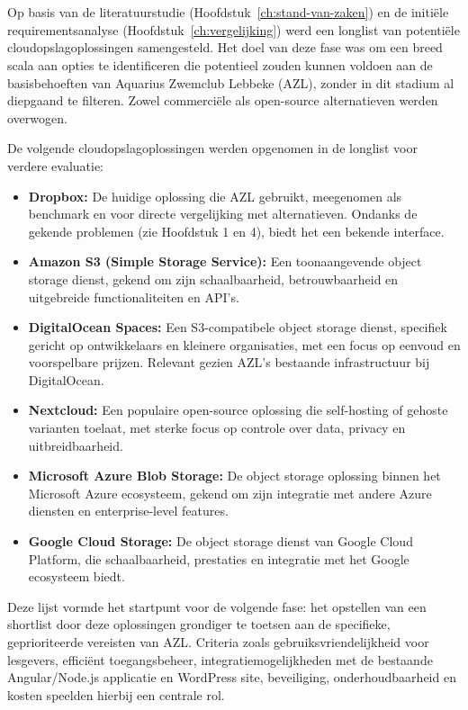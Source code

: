 \chapter{}
\label{ch:longlist}

Op basis van de literatuurstudie (Hoofdstuk~\ref{ch:stand-van-zaken}) en de initiële requirementsanalyse (Hoofdstuk~\ref{ch:vergelijking}) werd een longlist van potentiële cloudopslagoplossingen samengesteld. Het doel van deze fase was om een breed scala aan opties te identificeren die potentieel zouden kunnen voldoen aan de basisbehoeften van Aquarius Zwemclub Lebbeke (AZL), zonder in dit stadium al diepgaand te filteren. Zowel commerciële als open-source alternatieven werden overwogen.

De volgende cloudopslagoplossingen werden opgenomen in de longlist voor verdere evaluatie:

\begin{itemize}
    \item \textbf{Dropbox:} De huidige oplossing die AZL gebruikt, meegenomen als benchmark en voor directe vergelijking met alternatieven. Ondanks de gekende problemen (zie Hoofdstuk 1 en 4), biedt het een bekende interface.
    \item \textbf{Amazon S3 (Simple Storage Service):} Een toonaangevende object storage dienst, gekend om zijn schaalbaarheid, betrouwbaarheid en uitgebreide functionaliteiten en API's.
    \item \textbf{DigitalOcean Spaces:} Een S3-compatibele object storage dienst, specifiek gericht op ontwikkelaars en kleinere organisaties, met een focus op eenvoud en voorspelbare prijzen. Relevant gezien AZL's bestaande infrastructuur bij DigitalOcean.
    \item \textbf{Nextcloud:} Een populaire open-source oplossing die self-hosting of gehoste varianten toelaat, met sterke focus op controle over data, privacy en uitbreidbaarheid.
    \item \textbf{Microsoft Azure Blob Storage:} De object storage oplossing binnen het Microsoft Azure ecosysteem, gekend om zijn integratie met andere Azure diensten en enterprise-level features.
    \item \textbf{Google Cloud Storage:} De object storage dienst van Google Cloud Platform, die schaalbaarheid, prestaties en integratie met het Google ecosysteem biedt.
\end{itemize}

Deze lijst vormde het startpunt voor de volgende fase: het opstellen van een shortlist door deze oplossingen grondiger te toetsen aan de specifieke, geprioriteerde vereisten van AZL. Criteria zoals gebruiksvriendelijkheid voor lesgevers, efficiënt toegangsbeheer, integratiemogelijkheden met de bestaande Angular/Node.js applicatie en WordPress site, beveiliging, onderhoudbaarheid en kosten speelden hierbij een centrale rol.
